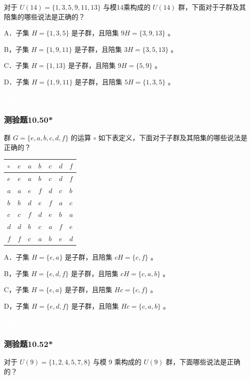 \documentclass[UTF8, heading=true]{ctexart}
\begin{document}
对于 ${U}(14)=\{1,3,5,9,11,13\}$ 与模14乘构成的 $U(14)$ 群，下面对于子群及其陪集的哪些说法是正确的？

A．子集 ${H}=\{1,3,5\}$ 是子群，且陪集 $9 {H}=\{3,9,13\}$ 。

B，子集 $H=\{1,9,11\}$ 是子群，且陪集 $3 H=\{3,5,13\}$ 。

C．子集 ${H}=\{1,13\}$ 是子群，且陪集 $9 {H}=\{5,9\}$ 。

D．子集 ${H}=\{1,9,11\}$ 是子群，且陪集 $5 {H}=\{1,3,5\}$ 。

\textcolor{white}{答案：BC}

\subsubsection{测验题10.50*}

群 $G=\{e, a, b, c, d, f\}$ 的运算 $\circ$ 如下表定义，下面对于子群及其陪集的哪些说法是正确的？
\begin{table}[H]
  \renewcommand{\arraystretch}{1.5}
  \centering
\begin{tabular}{l|llllll}
\hline$\circ$ & $e$ & $a$ & $b$ & $c$ & $d$ & $f$ \\
\hline$e$ & $e$ & $a$ & $b$ & $c$ & $d$ & $f$ \\
$a$ & $a$ & $e$ & $f$ & $d$ & $c$ & $b$ \\
$b$ & $b$ & $d$ & $e$ & $f$ & $a$ & $c$ \\
$c$ & $c$ & $f$ & $d$ & $e$ & $b$ & $a$ \\
$d$ & $d$ & $b$ & $c$ & $a$ & $f$ & $e$ \\
$f$ & $f$ & $c$ & $a$ & $b$ & $e$ & $d$ \\
\hline
\end{tabular}
\end{table}

A．子集 $H=\{e, a\}$ 是子群，且陪集 $c H=\{c, f\}$ 。

B，子集 $H=\{e, d, f\}$ 是子群，且陪集 $c H=\{c, a, b\}$ 。

C，子集 $H=\{e, a\}$ 是子群，且陪集 $H c=\{c, f\}$ 。

D，子集 $H=\{e, d, f\}$ 是子群，且陪集 $H c=\{c, a, b\}$ 。

\textcolor{white}{答案：ABD}

\subsubsection{测验题10.52*}

对于 $U(9)=\{1,2,4,5,7,8\}$ 与模 9 乘构成的 $U(9)$ 群，下面哪些说法是正确的？
\end{document}
